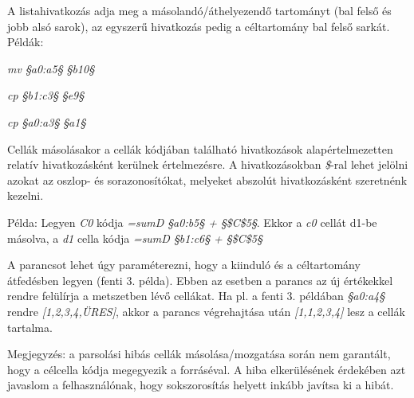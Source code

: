 A listahivatkozás adja meg a másolandó/áthelyezendő tartományt (bal felső és jobb alsó sarok), az egyszerű hivatkozás pedig a céltartomány bal felső sarkát. Példák:
\begin{compactenum}
	\item \textit{mv §a0:a5§ §b10§}
	\item \textit{cp §b1:c3§ §e9§}
	\item \textit{cp §a0:a3§ §a1§}
\end{compactenum}

Cellák másolásakor a cellák kódjában található hivatkozások alapértelmezetten relatív hivatkozásként kerülnek értelmezésre. A hivatkozásokban \textit{\$}-ral lehet jelölni azokat az oszlop- és sorazonosítókat, melyeket abszolút hivatkozásként szeretnénk kezelni.

Példa:
Legyen \textit{C0} kódja \textit{=sumD §a0:b5§ + §\$C\$5§}. Ekkor a \textit{c0} cellát {d1}-be másolva, a \textit{d1} cella kódja \textit{=sumD §b1:c6§ + §\$C\$5§}

A parancsot lehet úgy paraméterezni, hogy a kiinduló és a céltartomány átfedésben legyen (fenti 3. példa). Ebben az esetben a parancs az új értékekkel rendre felülírja a metszetben lévő cellákat. Ha pl. a fenti 3. példában \textit{§a0:a4§} rendre \textit{[1,2,3,4,ÜRES]}, akkor a parancs végrehajtása után \textit{[1,1,2,3,4]} lesz a cellák tartalma.

Megjegyzés: a parsolási hibás cellák másolása/mozgatása során nem garantált, hogy a célcella kódja megegyezik a forráséval. A hiba elkerülésének érdekében azt javaslom a felhasználónak, hogy sokszorosítás helyett inkább javítsa ki a hibát. 